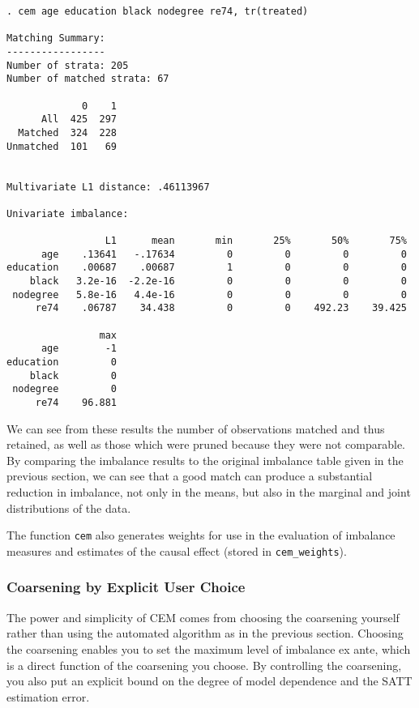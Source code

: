 \documentclass[11pt,titlepage]{article}
\begin{document}
\begin{verbatim}
. cem age education black nodegree re74, tr(treated)

Matching Summary:
-----------------
Number of strata: 205
Number of matched strata: 67

             0    1
      All  425  297
  Matched  324  228
Unmatched  101   69


Multivariate L1 distance: .46113967

Univariate imbalance:

                 L1      mean       min       25%       50%       75%
      age    .13641   -.17634         0         0         0         0
education    .00687    .00687         1         0         0         0
    black   3.2e-16  -2.2e-16         0         0         0         0
 nodegree   5.8e-16   4.4e-16         0         0         0         0
     re74    .06787    34.438         0         0    492.23    39.425

                max
      age        -1
education         0
    black         0
 nodegree         0
     re74    96.881

\end{verbatim}


We can see from these results the number of observations matched and
thus retained, as well as those which were pruned because they were
not comparable.  By comparing the imbalance results to the original
imbalance table given in the previous section, we can see that a good
match can produce a substantial reduction in imbalance, not only in
the means, but also in the marginal and joint distributions of the
data.

The function \texttt{cem} also generates weights for use in the
evaluation of imbalance measures and estimates of the causal effect
(stored in \texttt{cem\_weights}).

\subsubsection{Coarsening by Explicit User Choice}\label{s:cem-user}

The power and simplicity of CEM comes from choosing the coarsening
yourself rather than using the automated algorithm as in the previous
section.  Choosing the coarsening enables you to set the maximum level
of imbalance ex ante, which is a direct function of the coarsening you
choose.  By controlling the coarsening, you also put an explicit bound
on the degree of model dependence and the SATT estimation error.
\end{document}
